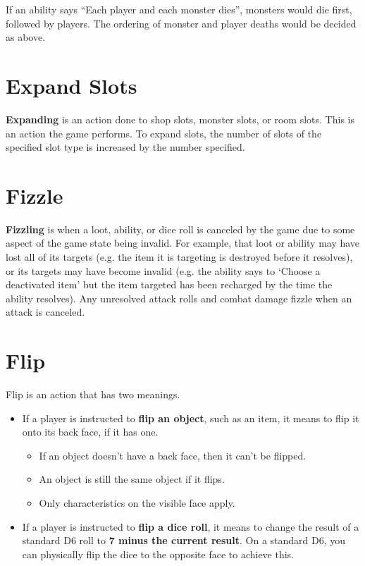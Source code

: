 \documentclass[
  fontsize=10pt,
  paper=a5,
  version=last,
  chapterprefix=true,
  bindingoffset=5mm,
  ]{scrbook}
\begin{document}
    If an ability says “Each player and each monster dies”, monsters would die first, followed by players. The ordering of monster and player deaths would be decided as above.
    \section{Expand Slots}
    \textbf{Expanding} is an action done to shop slots, monster slots, or room slots. This is an action the game performs. To expand slots, the number of slots of the specified slot type is increased by the number specified.
    \section{Fizzle}
    \textbf{Fizzling} is when a loot, ability, or dice roll is canceled by the game due to some aspect of the game state being invalid. For example, that loot or ability may have lost all of its targets (e.g. the item it is targeting is destroyed before it resolves), or its targets may have become invalid (e.g. the ability says to ‘Choose a deactivated item’ but the item targeted has been recharged by the time the ability resolves). Any unresolved attack rolls and combat damage fizzle when an attack is canceled.
    \section{Flip}
    Flip is an action that has two meanings.

    \begin{itemize}
        \item If a player is instructed to \textbf{flip an object}, such as an item, it means to flip it onto its back face, if it has one.
        \begin{itemize}
            \item If an object doesn’t have a back face, then it can’t be flipped.
            \item An object is still the same object if it flips.
            \item Only characteristics on the visible face apply.
        \end{itemize}
        \item If a player is instructed to \textbf{flip a dice roll}, it means to change the result of a standard D6 roll to \textbf{7 minus the current result}. On a standard D6, you can physically flip the dice to the opposite face to achieve this.
    \end{itemize}
\end{document}
